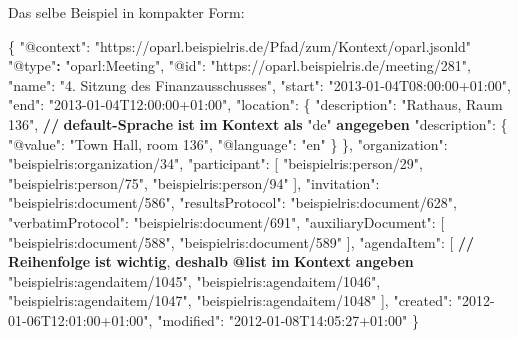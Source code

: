 \documentclass[,a4paper]{article}
\newenvironment{Shaded}{}{}
\newcommand{\DataTypeTok}[1]{\textcolor[rgb]{0.56,0.13,0.00}{{#1}}}
\newcommand{\StringTok}[1]{\textcolor[rgb]{0.25,0.44,0.63}{{#1}}}
\newcommand{\OtherTok}[1]{\textcolor[rgb]{0.00,0.44,0.13}{{#1}}}
\newcommand{\FunctionTok}[1]{\textcolor[rgb]{0.02,0.16,0.49}{{#1}}}
\newcommand{\ErrorTok}[1]{\textcolor[rgb]{1.00,0.00,0.00}{\textbf{{#1}}}}
\begin{document}
Das selbe Beispiel in kompakter Form:

\begin{Shaded}
\begin{Highlighting}[]
\FunctionTok{\{}
    \DataTypeTok{"@context"}\FunctionTok{:} \StringTok{"https://oparl.beispielris.de/Pfad/zum/Kontext/oparl.jsonld"}
    \StringTok{"@type"}\ErrorTok{:} \StringTok{"oparl:Meeting"}\FunctionTok{,}
    \DataTypeTok{"@id"}\FunctionTok{:} \StringTok{"https://oparl.beispielris.de/meeting/281"}\FunctionTok{,}
    \DataTypeTok{"name"}\FunctionTok{:} \StringTok{"4. Sitzung des Finanzausschusses"}\FunctionTok{,}
    \DataTypeTok{"start"}\FunctionTok{:} \StringTok{"2013-01-04T08:00:00+01:00"}\FunctionTok{,}
    \DataTypeTok{"end"}\FunctionTok{:} \StringTok{"2013-01-04T12:00:00+01:00"}\FunctionTok{,}
    \DataTypeTok{"location"}\FunctionTok{:} \FunctionTok{\{}
        \DataTypeTok{"description"}\FunctionTok{:} \StringTok{"Rathaus, Raum 136"}\FunctionTok{,} \ErrorTok{//} \ErrorTok{default-Sprache} \ErrorTok{ist} \ErrorTok{im} \ErrorTok{Kontext} \ErrorTok{als} \DataTypeTok{"de"} \ErrorTok{angegeben}
        \DataTypeTok{"description"}\FunctionTok{:} \FunctionTok{\{}
            \DataTypeTok{"@value"}\FunctionTok{:} \StringTok{"Town Hall, room 136"}\FunctionTok{,}
            \DataTypeTok{"@language"}\FunctionTok{:} \StringTok{"en"}
        \FunctionTok{\}}
    \FunctionTok{\},}
    \DataTypeTok{"organization"}\FunctionTok{:} \StringTok{"beispielris:organization/34"}\FunctionTok{,}
    \DataTypeTok{"participant"}\FunctionTok{:} \OtherTok{[}
        \StringTok{"beispielris:person/29"}\OtherTok{,}
        \StringTok{"beispielris:person/75"}\OtherTok{,}
        \StringTok{"beispielris:person/94"}
    \OtherTok{]}\FunctionTok{,}
    \DataTypeTok{"invitation"}\FunctionTok{:} \StringTok{"beispielris:document/586"}\FunctionTok{,}
    \DataTypeTok{"resultsProtocol"}\FunctionTok{:} \StringTok{"beispielris:document/628"}\FunctionTok{,}
    \DataTypeTok{"verbatimProtocol"}\FunctionTok{:} \StringTok{"beispielris:document/691"}\FunctionTok{,}
    \DataTypeTok{"auxiliaryDocument"}\FunctionTok{:} \OtherTok{[}
        \StringTok{"beispielris:document/588"}\OtherTok{,}
        \StringTok{"beispielris:document/589"}
    \OtherTok{]}\FunctionTok{,}
    \DataTypeTok{"agendaItem"}\FunctionTok{:} \OtherTok{[}
    \ErrorTok{//} \ErrorTok{Reihenfolge} \ErrorTok{ist} \ErrorTok{wichtig}\OtherTok{,} \ErrorTok{deshalb} \ErrorTok{@list} \ErrorTok{im} \ErrorTok{Kontext} \ErrorTok{angeben}
        \StringTok{"beispielris:agendaitem/1045"}\OtherTok{,}
        \StringTok{"beispielris:agendaitem/1046"}\OtherTok{,}
        \StringTok{"beispielris:agendaitem/1047"}\OtherTok{,}
        \StringTok{"beispielris:agendaitem/1048"}
    \OtherTok{]}\FunctionTok{,}
    \DataTypeTok{"created"}\FunctionTok{:} \StringTok{"2012-01-06T12:01:00+01:00"}\FunctionTok{,}
    \DataTypeTok{"modified"}\FunctionTok{:} \StringTok{"2012-01-08T14:05:27+01:00"}
\FunctionTok{\}}
\end{Highlighting}
\end{Shaded}
\end{document}
